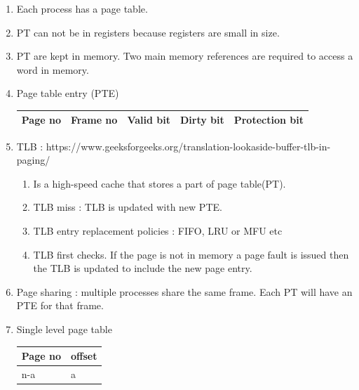 \begin{enumerate}
  \item Each process has a page table.
  \item PT can not be in registers because registers are small in size.
  \item PT are kept in memory. Two main memory references are required to access a word in memory.
  \item Page table entry (PTE) \\
  \begin{myTableStyle}
    \begin{tabular}{ |m{2cm}|m{2cm}|m{2cm}|m{2cm}|m{3cm}| } \hline
        Page no &  Frame no & Valid bit & Dirty bit & Protection bit  \\ \hline
    \end{tabular}
  \end{myTableStyle}
  \vspace{0.08in}


  \item TLB : https://www.geeksforgeeks.org/translation-lookaside-buffer-tlb-in-paging/
    \begin{enumerate}
      \item Is a high-speed cache that stores a part of page table(PT).
      \item TLB miss : TLB is updated with new PTE.
      \item TLB entry replacement policies : FIFO, LRU or MFU etc
      \item TLB first checks. If the page is not in memory a page fault is issued then the TLB is updated to include the new page entry.
    \end{enumerate}
    \vspace{0.08in}

    \item Page sharing : multiple processes share the same  frame. Each PT will have an PTE for that frame.
    \vspace{0.08in}

    \item Single level page table \\

    \begin{myTableStyle}
    \begin{tabular}{ |m{1.5cm}|m{1cm}| } \hline
        Page no  &  offset  \\ \hline
        n-a   &   a         \\ \hline
    \end{tabular}
  \end{myTableStyle}
  \vspace{0.08in}


\end{enumerate}
